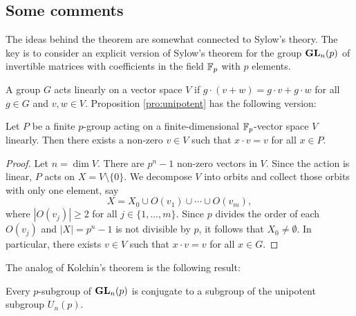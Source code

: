 \subsection{Some comments}

The ideas behind the theorem are somewhat connected to Sylow's theory. The key is to consider an explicit version of Sylow's theorem for the group $\mathbf{GL}_n(p)$ of invertible matrices 
with coefficients in the field $\mathbb{F}_p$ with $p$ elements. 

A group $G$ acts linearly on a vector space $V$ 
if $g\cdot (v+w)=g\cdot v+g\cdot w$
for all $g\in G$ and $v,w\in V$.
Proposition \ref{pro:unipotent} has the following
version:

\begin{proposition}
Let $P$ be a finite $p$-group acting on a finite-dimensional $\mathbb{F}_p$-vector space 
$V$ linearly. Then there exists a non-zero $v\in V$ 
such that $x\cdot v=v$ for all $x\in P$. 
\end{proposition}

\begin{proof}
    Let $n=\dim V$. There are $p^n-1$ non-zero vectors 
    in $V$. Since the action is linear, 
    $P$ acts  
    on $X=V\setminus\{0\}$. We decompose $V$ into orbits
    and collect those orbits with only one element, say 
    \[
    X=X_0\cup O(v_1)\cup \cdots\cup O(v_m),
    \]
    where $|O(v_j)|\geq 2$ for all $j\in\{1,\dots,m\}$. 
    Since 
    $p$ divides the order of each $O(v_j)$ and 
    $|X|=p^n-1$ is not divisible by $p$, 
    it follows that $X_0\ne\emptyset$. In particular, 
    there exists $v\in V$ such that $x\cdot v=v$ for
    all $x\in G$. 
\end{proof}

The analog of Kolchin's theorem is the following result:

\begin{proposition}
\label{pro:Kolchin}
    Every $p$-subgroup of $\mathbf{GL}_n(p)$ is conjugate to a subgroup
    of the unipotent subgroup $U_n(p)$. 
\end{proposition}


